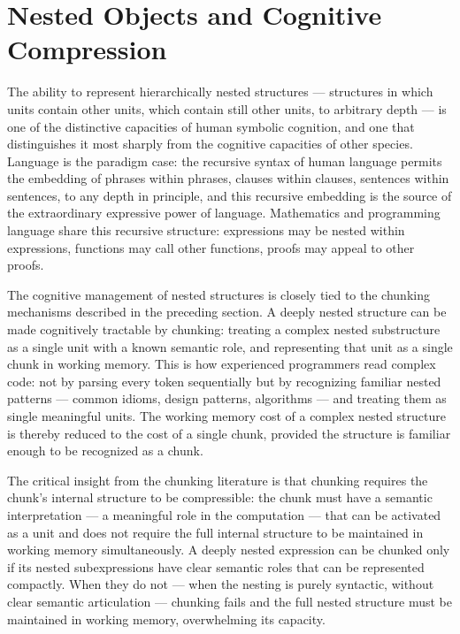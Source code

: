 \documentclass[12pt,openany]{book}
\theoremstyle{plain}
\theoremstyle{definition}
\theoremstyle{remark}
\begin{document}
\section{Nested Objects and Cognitive Compression}

The ability to represent hierarchically nested structures — structures in which units contain other units, which contain still other units, to arbitrary depth — is one of the distinctive capacities of human symbolic cognition, and one that distinguishes it most sharply from the cognitive capacities of other species. Language is the paradigm case: the recursive syntax of human language permits the embedding of phrases within phrases, clauses within clauses, sentences within sentences, to any depth in principle, and this recursive embedding is the source of the extraordinary expressive power of language. Mathematics and programming language share this recursive structure: expressions may be nested within expressions, functions may call other functions, proofs may appeal to other proofs.

The cognitive management of nested structures is closely tied to the chunking mechanisms described in the preceding section. A deeply nested structure can be made cognitively tractable by chunking: treating a complex nested substructure as a single unit with a known semantic role, and representing that unit as a single chunk in working memory. This is how experienced programmers read complex code: not by parsing every token sequentially but by recognizing familiar nested patterns — common idioms, design patterns, algorithms — and treating them as single meaningful units. The working memory cost of a complex nested structure is thereby reduced to the cost of a single chunk, provided the structure is familiar enough to be recognized as a chunk.

The critical insight from the chunking literature is that chunking requires the chunk's internal structure to be compressible: the chunk must have a semantic interpretation — a meaningful role in the computation — that can be activated as a unit and does not require the full internal structure to be maintained in working memory simultaneously. A deeply nested expression can be chunked only if its nested subexpressions have clear semantic roles that can be represented compactly. When they do not — when the nesting is purely syntactic, without clear semantic articulation — chunking fails and the full nested structure must be maintained in working memory, overwhelming its capacity.
\end{document}
